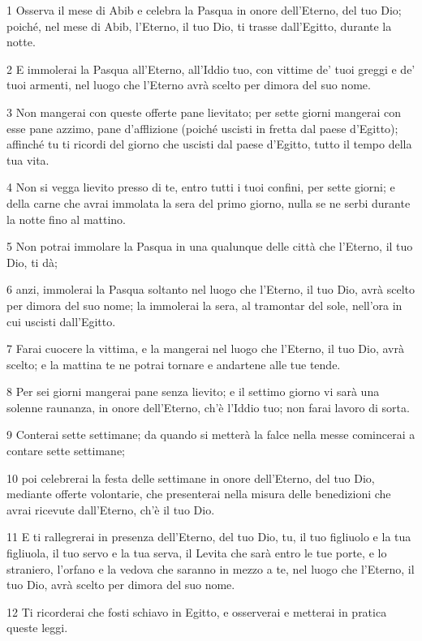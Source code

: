 \par 1 Osserva il mese di Abib e celebra la Pasqua in onore dell'Eterno, del tuo Dio; poiché, nel mese di Abib, l'Eterno, il tuo Dio, ti trasse dall'Egitto, durante la notte.
\par 2 E immolerai la Pasqua all'Eterno, all'Iddio tuo, con vittime de' tuoi greggi e de' tuoi armenti, nel luogo che l'Eterno avrà scelto per dimora del suo nome.
\par 3 Non mangerai con queste offerte pane lievitato; per sette giorni mangerai con esse pane azzimo, pane d'afflizione (poiché uscisti in fretta dal paese d'Egitto); affinché tu ti ricordi del giorno che uscisti dal paese d'Egitto, tutto il tempo della tua vita.
\par 4 Non si vegga lievito presso di te, entro tutti i tuoi confini, per sette giorni; e della carne che avrai immolata la sera del primo giorno, nulla se ne serbi durante la notte fino al mattino.
\par 5 Non potrai immolare la Pasqua in una qualunque delle città che l'Eterno, il tuo Dio, ti dà;
\par 6 anzi, immolerai la Pasqua soltanto nel luogo che l'Eterno, il tuo Dio, avrà scelto per dimora del suo nome; la immolerai la sera, al tramontar del sole, nell'ora in cui uscisti dall'Egitto.
\par 7 Farai cuocere la vittima, e la mangerai nel luogo che l'Eterno, il tuo Dio, avrà scelto; e la mattina te ne potrai tornare e andartene alle tue tende.
\par 8 Per sei giorni mangerai pane senza lievito; e il settimo giorno vi sarà una solenne raunanza, in onore dell'Eterno, ch'è l'Iddio tuo; non farai lavoro di sorta.
\par 9 Conterai sette settimane; da quando si metterà la falce nella messe comincerai a contare sette settimane;
\par 10 poi celebrerai la festa delle settimane in onore dell'Eterno, del tuo Dio, mediante offerte volontarie, che presenterai nella misura delle benedizioni che avrai ricevute dall'Eterno, ch'è il tuo Dio.
\par 11 E ti rallegrerai in presenza dell'Eterno, del tuo Dio, tu, il tuo figliuolo e la tua figliuola, il tuo servo e la tua serva, il Levita che sarà entro le tue porte, e lo straniero, l'orfano e la vedova che saranno in mezzo a te, nel luogo che l'Eterno, il tuo Dio, avrà scelto per dimora del suo nome.
\par 12 Ti ricorderai che fosti schiavo in Egitto, e osserverai e metterai in pratica queste leggi.
